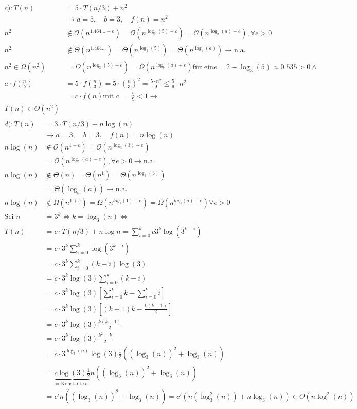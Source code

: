 \documentclass[a4paper,10pt,oneside,leqno]{scrartcl}
\begin{document}
\begin{align*}
   c): T(n)&= 5 \cdot T(n/3) + n^2\\
    &\rightarrow a = 5, \quad b = 3, \quad f(n) = n^2\\
    n^2 &\notin \mathcal{O}(n^{1.464...-e}) = \mathcal{O}(n^{\log_3(5)-e}) = \mathcal{O}(n^{\log_b(a)-e}), \forall e > 0 \\
    n^2 &\notin \Theta(n^{1.464...}) = \Theta(n^{\log_3(5)}) = \Theta(n^{\log_b(a)}) \rightarrow \text{n.a.}\\
    n^2 \in \Omega(n^2) &= \Omega(n^{\log_3(5)+e}) = \Omega(n^{\log_b(a)+e}) \text{für ein} e = 2 - \log_3(5) \approx 0.535 > 0 \wedge\\
    a \cdot f(\frac{n}{b}) &= 5 \cdot f(\frac{n}{3}) = 5 \cdot (\frac{n}{3})^2 = \frac{5 \cdot n^2}{9} \leq \frac{5}{9} \cdot n^2\\
    &= c \cdot f(n) \text{mit c } = \frac{5}{9} < 1 \rightarrow\\
    T(n) \in \Theta(n^2)\\
\end{align*}
\begin{align*}
   d): T(n)&= 3 \cdot T(n/3) + n \log(n)\\
    &\rightarrow a = 3, \quad b = 3, \quad f(n) = n \log (n) \\
    n \log(n) &\notin \mathcal{O}(n^{1-e}) = \mathcal{O}(n^{\log_3(3)-e})\\
      &= \mathcal{O}(n^{\log_b(a)-e}), \forall e > 0 \rightarrow \text{n.a.}\\
    n \log(n) &\notin \Theta(n) = \Theta(n^1) = \Theta(n^{\log_3(3)})\\
      &= \Theta(\log_b(a)) \rightarrow \text{n.a.}\\
    n \log(n) &\notin \Omega(n^{1+e}) = \Omega(n^{log_1(1)+e}) = \Omega(n^{log_b(a)+e}) \forall e > 0\\
    \text{Sei } n &= 3^k \iff k = \log_3(n) \iff\\
    T(n) &= c \cdot T(n/3) + n \log n = \sum_{i=0}^{k} c 3^k \log(3^{k-i})\\
    &= c\cdot3^{k} \sum_{i=0}^{k} \log(3^{k-i})\\
    &= c\cdot3^k \sum_{i=0}^{k}(k-i)\log(3)\\
    &= c\cdot3^k\log(3) \sum_{i=0}^{k}(k-i)\\
    &= c\cdot3^k\log(3) \left[\sum_{i=0}^{k}k-\sum_{i=0}^{k}i\right]\\
    &= c\cdot3^k\log(3) \left[ (k+1)k - \frac{k(k+1)}{2} \right]\\
    &= c\cdot3^k\log(3) \frac{k(k+1)}{2}\\
    &= c\cdot3^k\log(3) \frac{k^2+k}{2}\\
    &= c\cdot3^{\log_3(n)}\log(3)\frac{1}{2}((\log_3(n))^2+\log_3(n))\\
    &= \underbrace{c\log(3)\frac{1}{2}}_{\text{= Konstante c'}}n((\log_3(n))^2+\log_3(n))\\
    &= c' n((\log_3(n))^2+\log_3(n)) = c' (n(\log_3^2(n))+n\log_3(n)) \in \Theta(n \log^2(n))
\end{align*}
\end{document}
